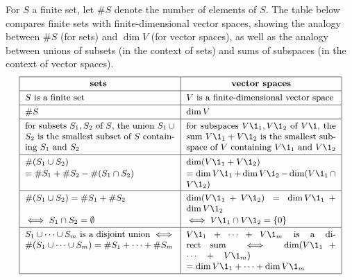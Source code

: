 For $S$ a finite set, let $\#S$ denote the number of elements of $S$. The table below compares finite sets with finite-dimensional vector spaces, showing the analogy between $\#S$ (for sets) and $\dim V$ (for vector spaces), as well as the analogy between unions of subsets (in the context of sets) and sums of subspaces (in the context of vector spaces).%
\[
\begin{tabular}{|p{2.13in}|p{2.13in}|}
\hline
\vspace{-5bp}\hfil\small\textbf{sets} \vspace{1bp}& \vspace{-5bp}\hfil\small\textbf{vector spaces}\\ \hline
\vspace{-5bp}\small $S$ is a finite set \vspace{1bp}& \vspace{-5bp}\small $V$ is a finite-dimensional vector space\\ \hline
\vspace{-5bp}\small $\#S$ \vspace{1bp} & \vspace{-5bp}\small $\dim V$ \\ \hline
\vspace{-5bp}\small for subsets $S_1, S_2$ of $S$, the union $S_1 \cup S_2$ is the smallest subset of $S$ containing $S_1$ and $S_2$ \vspace{1bp}
& \vspace{-5bp}\small for subspaces $V\1_1, V\1_2$ of $V\1$, the sum $V\1_1 + V\1_2$ is the smallest subspace of $V$ containing $V\1_1$ and $V\1_2$\\ \hline
\vspace{-5bp}\small $\#(S_1 \cup S_2)$ & \vspace{-5bp}\small $\dim(V\1_1 + V\1_2)$  \\
\small $ = \#S_1 + \#S_2 - \#(S_1 \cap S_2)$ \vspace{1bp}
&\small $= \dim V\1_1 + \dim V\1_2 - \dim(V\1_1 \cap V\1_2)$\\
\hline
\vspace{-5bp}\small $\#(S_1 \cup S_2) = \#S_1 + \#S_2 $
& \vspace{-5bp}\small $\dim(V\1_1 + V\1_2) = \dim V\1_1 + \dim V\1_2$ \\
\small $\iff S_1 \cap S_2 = \emptyset$ \vspace{1bp} & \small $\iff V\1_1 \cap V\1_2 = \br{0}$\\ \hline
\vspace{-5bp}\small $S_1 \cup \cdots \cup S_m$ is a disjoint union $\iff$ $\#(S_1 \cup \cdots \cup S_m) = \#S_1 + \cdots + \#S_m$
& \vspace{-5bp}\small $V\1_1 + \cdots + V\1_m$ is a direct sum $\iff$  $\dim(V\1_1 + \cdots + V\1_m) \hspace{1in}\ $ $= \dim V\1_1 + \cdots + \dim V\1_m$ \vspace{1bp}\\
\hline
\end{tabular}
\]

